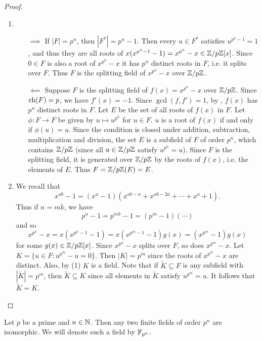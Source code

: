 \documentclass[11pt]{article}
\begin{document}
\begin{proof}\,
    \begin{enumerate}
        \item\begin{itemize}
            \item[$\implies$] If $|F|=p^n$, then $|F^*|=p^n-1$. Then every $u\in F^*$ satisfies $u^{p^n-1}=1$, and thus they are all roots of $x(x^{p^n-1}-1)=x^{p^n}-x\in\mathbb{Z}/p\mathbb{Z}[x]$. Since $0\in F$ is also a root of $x^{p^n}-x$ it has $p^n$ distinct roots in $F$, i.e. it splits over $F$. Thus $F$ is the splitting field of $x^{p^n}-x$ over $\mathbb{Z}/p\mathbb{Z}$.

            \item[$\impliedby$] Suppose $F$ is the splitting field of $f(x)=x^{p^n}-x$ over $\mathbb{Z}/p\mathbb{Z}$. Since $\operatorname{ch}(F)=p$, we have $f'(x)=-1$. Since $\gcd(f,f')=1$, by , $f(x)$ has $p^n$ distinct roots in $F$. Let $E$ be the set of all roots of $f(x)$ in $F$. Let $\phi:F\to F$ be given by $u\mapsto u^{p^n}$ for $u\in F$. $u$ is a root of $f(x)$ if and only if $\phi(u)=u$. Since the condition is closed under addition, subtraction, multiplication and division, the set $E$ is a subfield of $F$ of order $p^n$, which contains $\mathbb{Z}/p\mathbb{Z}$ (since all $u\in\mathbb{Z}/p\mathbb{Z}$ satisfy $u^{p^n}=u$). Since $F$ is the splitting field, it is generated over $\mathbb{Z}/p\mathbb{Z}$ by the roots of $f(x)$, i.e. the elements of $E$. Thus $F=\mathbb{Z}/p\mathbb{Z}(E)=E$.
        \end{itemize}
        \item We recall that 
        \[x^{ab}-1=(x^a-1)(x^{ab-a}+x^{ab-2a}+\cdots+x^a+1).\]
        Thus if $n=mk$, we have
        \[p^n-1=p^{mk}-1=(p^m-1)(\cdots)\]
        and so
        \[x^{p^n}-x=x(x^{p^n-1}-1)=x(x^{p^m-1}-1)g(x)=(x^{p^m}-1)g(x)\]
        for some $g(x)\in\mathbb{Z}/p\mathbb{Z}[x]$. Since $x^{p^n}-x$ splits over $F$, so does $x^{p^m}-x$. Let $K=\{u\in F:u^{p^m}-u=0\}$. Then $|K|=p^m$ since the roots of $x^{p^m}-x$ are distinct. Also, by (1) $K$ is a field. Note that if $\tilde{K}\subseteq F$ is any subfield with $|\tilde{K}|=p^m$, then $\tilde{K}\subseteq K$ since all elements in $\tilde{K}$ satisfy $u^{p^m}=u$. It follows that $\tilde{K}=K$.
    \end{enumerate}
\end{proof}

\begin{corollary}[E. H. Moore]
    Let $p$ be a prime and $n\in\mathbb{N}$. Then any two finite fields of order $p^n$ are isomorphic. We will denote such a field by $\mathbb{F}_{p^n}$.
    
\end{corollary}
\end{document}
